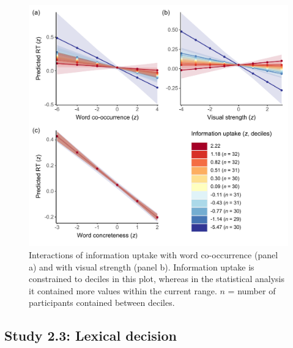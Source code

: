 \documentclass[
  12pt,
  man,floatsintext]{apa7}
\begin{document}
\begin{figure}

{\centering \includegraphics[width=0.95\linewidth]{../semanticdecision/frequentist_analysis/plots/semanticdecision-interactions-with-information-uptake} 

}

\caption{Interactions of information uptake with word co-occurrence (panel a) and with visual strength (panel b). Information uptake is constrained to deciles in this plot, whereas in the statistical analysis it contained more values within the current range. \(n\) = number of participants contained between deciles.}\label{fig:semanticdecision-interactions-with-information-uptake}
\end{figure}

\clearpage

\hypertarget{study-2.3-lexical-decision-3}{%
\subsection{Study 2.3: Lexical decision}\label{study-2.3-lexical-decision-3}}
\end{document}
